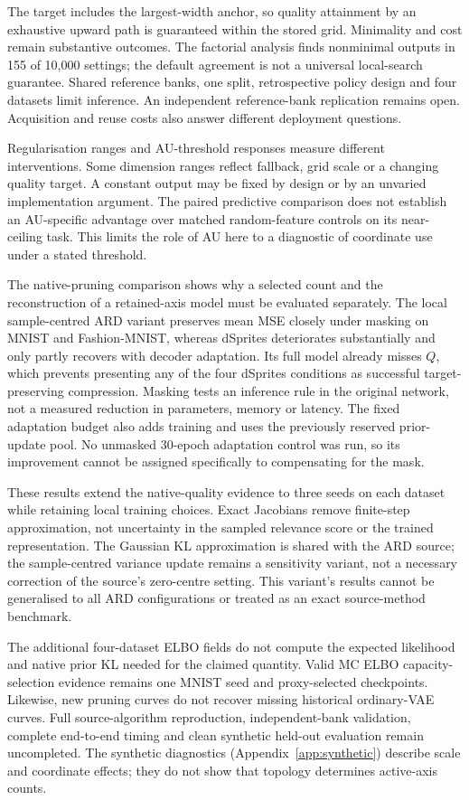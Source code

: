 \documentclass[make,article,submit,pdftex,moreauthors]{Definitions/mdpi}
\begin{document}
The target includes the largest-width anchor, so quality attainment by
an exhaustive upward path is guaranteed within the stored grid.
Minimality and cost remain substantive outcomes. The factorial analysis
finds nonminimal outputs in 155 of 10,000 settings; the default agreement
is not a universal local-search guarantee. Shared reference banks, one
split, retrospective policy design and four datasets limit inference.
An independent reference-bank replication remains open. Acquisition
and reuse costs also answer different deployment questions.

Regularisation ranges and AU-threshold responses measure different
interventions. Some dimension ranges reflect fallback, grid scale or a
changing quality target. A constant output may be fixed by design or by
an unvaried implementation argument. The paired predictive comparison
does not establish an AU-specific advantage over matched random-feature
controls on its near-ceiling task. This limits the role of AU here to
a diagnostic of coordinate use under a stated threshold.

The native-pruning comparison shows why a selected count and the
reconstruction of a retained-axis model must be evaluated separately.
The local sample-centred ARD variant preserves mean MSE closely under
masking on MNIST and Fashion-MNIST, whereas dSprites deteriorates
substantially and only partly recovers with decoder adaptation.
Its full model already misses $Q$, which prevents presenting any of
the four dSprites conditions as successful target-preserving compression.
Masking tests an inference rule in the original network, not a measured
reduction in parameters, memory or latency. The fixed adaptation
budget also adds training and uses the previously reserved prior-update
pool. No unmasked 30-epoch adaptation control was run, so its improvement
cannot be assigned specifically to compensating for the mask.

These results extend the native-quality evidence to three seeds on each
dataset while retaining local training choices. Exact Jacobians remove
finite-step approximation, not uncertainty in the sampled relevance
score or the trained representation. The Gaussian KL approximation is
shared with the ARD source; the sample-centred variance update remains
a sensitivity variant, not a necessary correction of the source's
zero-centre setting. This variant's results cannot be generalised to
all ARD configurations or treated as an exact source-method benchmark.

The additional four-dataset ELBO fields do not compute the expected
likelihood and native prior KL needed for the claimed quantity. Valid
MC ELBO capacity-selection evidence remains one MNIST seed and
proxy-selected checkpoints. Likewise, new pruning curves do not recover
missing historical ordinary-VAE curves. Full source-algorithm reproduction,
independent-bank validation, complete end-to-end timing and clean synthetic
held-out evaluation remain uncompleted. The synthetic diagnostics
(Appendix~\ref{app:synthetic}) describe scale and coordinate effects;
they do not show that topology determines active-axis counts.
\end{document}
